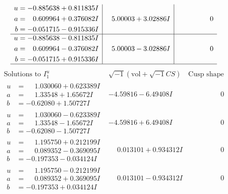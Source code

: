 \documentclass[1p]{elsarticle_modified}
\theoremstyle{definition}
\newcommand{\I}{\sqrt{-1}}
\begin{document}
$$\begin{array}{c|c|c}
\begin{aligned}
u &= -0.885638 + 0.811835 I \\
a &= \phantom{-}0.609964 + 0.376082 I \\
b &= -0.051715 - 0.915336 I\end{aligned}
 & \phantom{-}5.00003 + 3.02886 I & \phantom{-0.000000 } 0 \\ \hline\begin{aligned}
u &= -0.885638 - 0.811835 I \\
a &= \phantom{-}0.609964 - 0.376082 I \\
b &= -0.051715 + 0.915336 I\end{aligned}
 & \phantom{-}5.00003 - 3.02886 I & \phantom{-0.000000 } 0\\
 \hline 
 \end{array}$$\newpage$$\begin{array}{c|c|c}  
\text{Solutions to }I^u_{1}& \I (\text{vol} + \sqrt{-1}CS) & \text{Cusp shape}\\
 \hline 
\begin{aligned}
u &= \phantom{-}1.030060 + 0.623389 I \\
a &= \phantom{-}1.33548 + 1.65672 I \\
b &= -0.62080 + 1.50727 I\end{aligned}
 & -4.59816 - 6.49408 I & \phantom{-0.000000 } 0 \\ \hline\begin{aligned}
u &= \phantom{-}1.030060 - 0.623389 I \\
a &= \phantom{-}1.33548 - 1.65672 I \\
b &= -0.62080 - 1.50727 I\end{aligned}
 & -4.59816 + 6.49408 I & \phantom{-0.000000 } 0 \\ \hline\begin{aligned}
u &= \phantom{-}1.195750 + 0.212199 I \\
a &= \phantom{-}0.089352 - 0.369095 I \\
b &= -0.197353 - 0.034124 I\end{aligned}
 & \phantom{-}0.013101 + 0.934312 I & \phantom{-0.000000 } 0 \\ \hline\begin{aligned}
u &= \phantom{-}1.195750 - 0.212199 I \\
a &= \phantom{-}0.089352 + 0.369095 I \\
b &= -0.197353 + 0.034124 I\end{aligned}
 & \phantom{-}0.013101 - 0.934312 I & \phantom{-0.000000 } 0 \\ \hline\begin{aligned}

\end{aligned}
\end{array}$$
\end{document}
